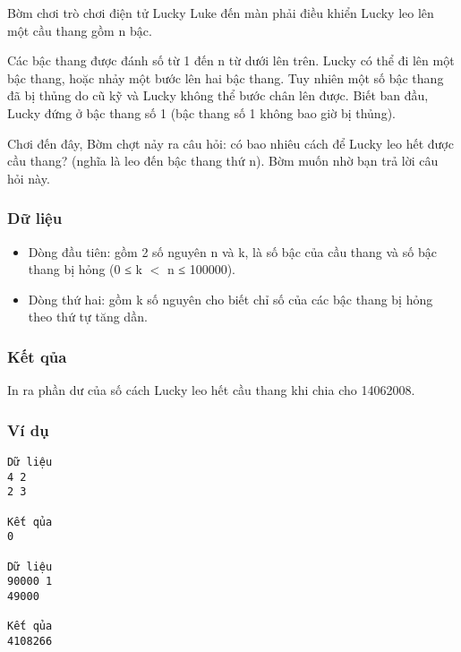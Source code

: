 

Bờm chơi trò chơi điện tử Lucky Luke đến màn phải điều khiển Lucky leo lên một cầu thang gồm n bậc.

Các bậc thang được đánh số từ 1 đến n từ dưới lên trên. Lucky có thể đi lên một bậc thang, hoặc nhảy một bước lên hai bậc thang. Tuy nhiên một số bậc thang đã bị thủng do cũ kỹ và Lucky không thể bước chân lên được. Biết ban đầu, Lucky đứng ở bậc thang số 1 (bậc thang số 1 không bao giờ bị thủng).

Chơi đến đây, Bờm chợt nảy ra câu hỏi: có bao nhiêu cách để Lucky leo hết được cầu thang? (nghĩa là leo đến bậc thang thứ n). Bờm muốn nhờ bạn trả lời câu hỏi này.

\subsubsection{Dữ liệu}
\begin{itemize}
	\item Dòng đầu tiên: gồm 2 số nguyên n và k, là số bậc của cầu thang và số bậc thang bị hỏng (0 ≤ k $<$ n ≤ 100000).
	\item Dòng thứ hai: gồm k số nguyên cho biết chỉ số của các bậc thang bị hỏng theo thứ tự tăng dần.
\end{itemize}

\subsubsection{Kết qủa}

In ra phần dư của số cách Lucky leo hết cầu thang khi chia cho 14062008.

\subsubsection{Ví dụ}
\begin{verbatim}
Dữ liệu
4 2
2 3

Kết qủa
0

Dữ liệu
90000 1
49000

Kết qủa
4108266
\end{verbatim}